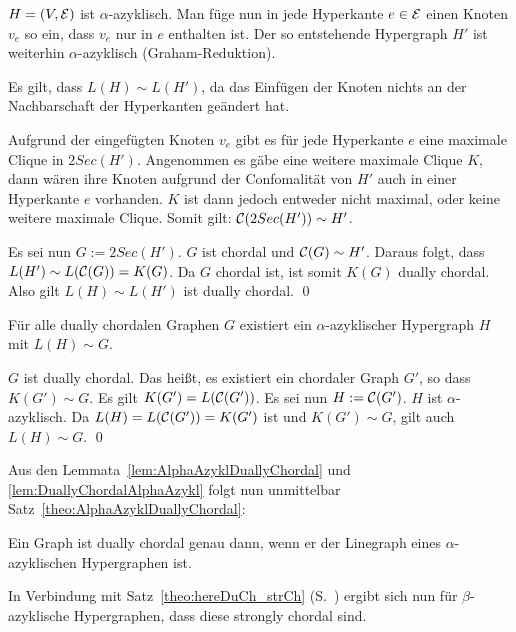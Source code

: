 \begin{Proof}
    $H=(V,\mathcal{E})$ ist $\alpha$-azyklisch.    Man füge nun in jede Hyperkante $e\in\mathcal{E}$ einen Knoten $v_e$ so ein, dass $v_e$ nur in $e$ enthalten ist. Der so entstehende Hypergraph $H'$ ist weiterhin $\alpha$-azyklisch (Graham-Reduktion).
    
    Es gilt, dass $L(H)\sim L(H')$, da das Einfügen der Knoten nichts an der Nachbarschaft der Hyperkanten geändert hat.
    
    Aufgrund der eingefügten Knoten $v_e$ gibt es für jede Hyperkante $e$ eine maximale Clique in $2Sec(H')$. Angenommen es gäbe eine weitere maximale Clique $K$, dann wären ihre Knoten aufgrund der Confomalität von $H'$ auch in einer Hyperkante $e$ vorhanden. $K$ ist dann jedoch entweder nicht maximal, oder keine weitere maximale Clique. Somit gilt: $\mathcal{C}(2Sec(H'))\sim H'$.
    
    Es sei nun $G := 2Sec(H')$. $G$ ist chordal und $\mathcal{C}(G) \sim H'$. Daraus folgt, dass $L(H')\sim L(\mathcal{C}(G))=K(G)$. Da $G$ chordal ist, ist somit $K(G)$ dually chordal. Also gilt $L(H)\sim L(H')$ ist dually chordal.
    \qed
\end{Proof}

\begin{Lemma}\label{lem:DuallyChordalAlphaAzykl}
    Für alle dually chordalen Graphen $G$ existiert ein $\alpha$-azyklischer Hypergraph $H$ mit $L(H)\sim G$.
\end{Lemma}

\begin{Proof}
    $G$ ist dually chordal. Das heißt, es existiert ein chordaler Graph $G'$, so dass $K(G')\sim G$. Es gilt $K(G') = L(\mathcal{C}(G'))$. Es sei nun $H:=\mathcal{C}(G')$. $H$ ist $\alpha$-azyklisch. Da $L(H) = L(\mathcal{C}(G')) = K(G')$ ist und $K(G') \sim G$, gilt auch $L(H) \sim G$.
    \qed
\end{Proof}

Aus den Lemmata~\ref{lem:AlphaAzyklDuallyChordal} und \ref{lem:DuallyChordalAlphaAzykl} folgt nun unmittelbar Satz~\ref{theo:AlphaAzyklDuallyChordal}:

\begin{Theorem}\label{theo:AlphaAzyklDuallyChordal}
    Ein Graph ist dually chordal genau dann, wenn er der Linegraph eines $\alpha$-azyklischen Hypergraphen ist.
\end{Theorem}

In Verbindung mit Satz~\ref{theo:hereDuCh_strCh} (S.~\pageref{theo:hereDuCh_strCh}) ergibt sich nun für $\beta$-azyklische Hypergraphen, dass diese strongly chordal sind.

